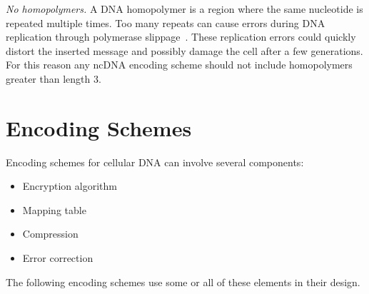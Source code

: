 \documentclass{bioinfo}
\begin{document}
\textit{No homopolymers.} A DNA homopolymer is a region where the same nucleotide is repeated multiple times. Too many repeats can cause errors during DNA replication through polymerase slippage~\cite{VCE2001TEJ}. These replication errors could quickly distort the inserted message and possibly damage the cell after a few generations. For this reason any ncDNA encoding scheme should not include homopolymers greater than length 3.

\section{Encoding Schemes}

Encoding schemes for cellular DNA can involve several components:

\begin{itemize}
\item Encryption algorithm
\item Mapping table
\item Compression
\item Error correction
\end{itemize}

The following encoding schemes use some or all of these elements in their design.
\end{document}
